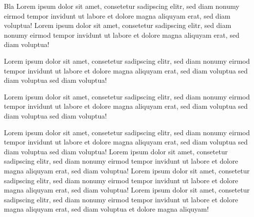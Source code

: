 \documentclass[
shownotess=true,
showresults=false,
edumath,
]{edu}
\begin{document}
\begin{cols}[4]
	Bla Lorem ipsum dolor sit amet, consetetur sadipscing elitr, sed diam nonumy eirmod tempor invidunt ut labore et dolore magna aliquyam erat, sed diam voluptua! Lorem ipsum dolor sit amet, consetetur sadipscing elitr, sed diam nonumy eirmod tempor invidunt ut labore et dolore magna aliquyam erat, sed diam voluptua! 
  	
  	Lorem ipsum dolor sit amet, consetetur sadipscing elitr, sed diam nonumy eirmod tempor invidunt ut labore et dolore magna aliquyam erat, sed diam voluptua sed diam voluptua sed diam voluptua! 
    
  	
  	Lorem ipsum dolor sit amet, consetetur sadipscing elitr, sed diam nonumy eirmod tempor invidunt ut labore et dolore magna aliquyam erat, sed diam voluptua sed diam voluptua sed diam voluptua! 
    \colbreak
  	
  	Lorem ipsum dolor sit amet, consetetur sadipscing elitr, sed diam nonumy eirmod tempor invidunt ut labore et dolore magna aliquyam erat, sed diam voluptua sed diam voluptua sed diam voluptua! 
    \colbreak
    Lorem ipsum dolor sit amet, consetetur sadipscing elitr, sed diam nonumy eirmod tempor invidunt ut labore et dolore magna aliquyam erat, sed diam voluptua! 
    \colbreak
    Lorem ipsum dolor sit amet, consetetur sadipscing elitr, sed diam nonumy eirmod tempor invidunt ut labore et dolore magna aliquyam erat, sed diam voluptua! Lorem ipsum dolor sit amet, consetetur sadipscing elitr, sed diam nonumy eirmod tempor invidunt ut labore et dolore magna aliquyam erat, sed diam voluptua et dolore magna aliquyam! 
\end{cols}
\end{document}
